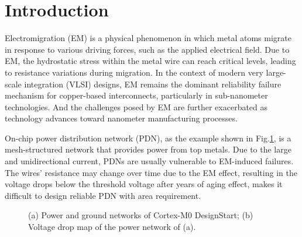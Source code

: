 \section{Introduction}
\label{sec:intro}
Electromigration (EM) is a physical phenomenon in which metal atoms migrate in response to various driving forces, such as the applied electrical field. 
Due to EM, the hydrostatic stress within the metal wire can reach critical levels, leading to resistance variations during migration. 
In the context of modern very large-scale integration (VLSI) designs, EM remains the dominant reliability failure mechanism for copper-based interconnects, particularly in sub-nanometer technologies. And the challenges posed by EM are further exacerbated as technology advances toward nanometer manufacturing processes. 


On-chip power distribution network (PDN), as the example shown in Fig.\ref{fig:pgimage}, is a mesh-structured network that provides power from top metals. 
Due to the large and unidirectional current, PDNs are usually vulnerable to EM-induced failures. The wires' resistance may change over time due to the EM effect, resulting in the voltage drops below the threshold voltage after years of aging effect, makes it difficult to design reliable PDN with area requirement.

\begin{figure}[htp]
	\centering
	\caption{(a) Power and ground networks of Cortex-M0 DesignStart; (b) Voltage drop map of the power network of (a).}
	\label{fig:pgimage}
\end{figure}


